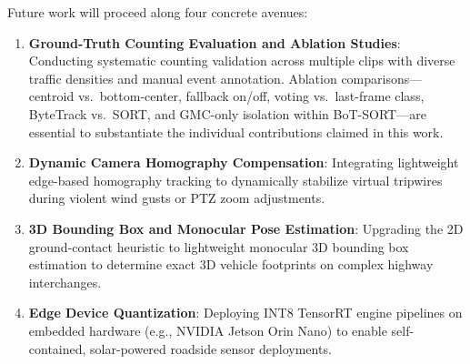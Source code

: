 Future work will proceed along four concrete avenues:
\begin{enumerate}
    \item \textbf{Ground-Truth Counting Evaluation and Ablation Studies}: Conducting systematic counting validation across multiple clips with diverse traffic densities and manual event annotation. Ablation comparisons---centroid vs.\ bottom-center, fallback on/off, voting vs.\ last-frame class, ByteTrack vs.\ SORT, and GMC-only isolation within BoT-SORT---are essential to substantiate the individual contributions claimed in this work.
    \item \textbf{Dynamic Camera Homography Compensation}: Integrating lightweight edge-based homography tracking to dynamically stabilize virtual tripwires during violent wind gusts or PTZ zoom adjustments.
    \item \textbf{3D Bounding Box and Monocular Pose Estimation}: Upgrading the 2D ground-contact heuristic to lightweight monocular 3D bounding box estimation to determine exact 3D vehicle footprints on complex highway interchanges.
    \item \textbf{Edge Device Quantization}: Deploying INT8 TensorRT engine pipelines on embedded hardware (e.g., NVIDIA Jetson Orin Nano) to enable self-contained, solar-powered roadside sensor deployments.
\end{enumerate}

